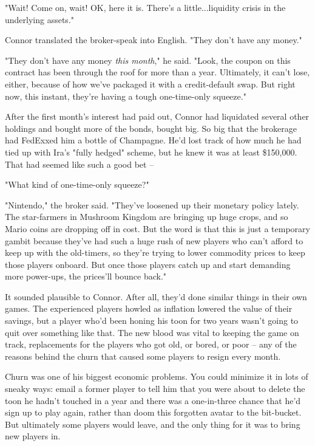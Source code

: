"Wait! Come on, wait! OK, here it is. There's a little...liquidity
crisis in the underlying assets."

Connor translated the broker-speak into English. "They don't have
any money."

"They don't have any money \emph{this month}," he said. "Look, the
coupon on this contract has been through the roof for more than a
year. Ultimately, it can't lose, either, because of how we've
packaged it with a credit-default swap. But right now, this
instant, they're having a tough one-time-only squeeze."

After the first month's interest had paid out, Connor had
liquidated several other holdings and bought more of the bonds,
bought big. So big that the brokerage had FedExxed him a bottle of
Champagne. He'd lost track of how much he had tied up with Ira's
"fully hedged" scheme, but he knew it was at least \$150,000. That
had seemed like such a good bet --

"What kind of one-time-only squeeze?"

"Nintendo," the broker said. "They've loosened up their monetary
policy lately. The star-farmers in Mushroom Kingdom are bringing up
huge crops, and so Mario coins are dropping off in cost. But the
word is that this is just a temporary gambit because they've had
such a huge rush of new players who can't afford to keep up with
the old-timers, so they're trying to lower commodity prices to keep
those players onboard. But once those players catch up and start
demanding more power-ups, the prices'll bounce back."

It sounded plausible to Connor. After all, they'd done similar
things in their own games. The experienced players howled as
inflation lowered the value of their savings, but a player who'd
been honing his toon for two years wasn't going to quit over
something like that. The new blood was vital to keeping the game on
track, replacements for the players who got old, or bored, or poor
-- any of the reasons behind the churn that caused some players to
resign every month.

Churn was one of his biggest economic problems. You could minimize
it in lots of sneaky ways: email a former player to tell him that
you were about to delete the toon he hadn't touched in a year and
there was a one-in-three chance that he'd sign up to play again,
rather than doom this forgotten avatar to the bit-bucket. But
ultimately some players would leave, and the only thing for it was
to bring new players in.

